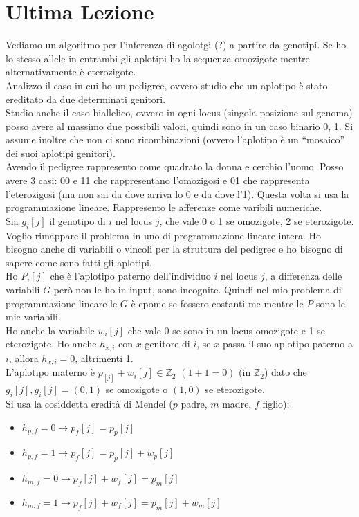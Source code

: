 \documentclass[a4paper,12pt, oneside]{book}
\begin{document}
\chapter{Ultima Lezione}
Vediamo un algoritmo per l'inferenza di agolotgi (?) a partire da
genotipi. Se ho lo stesso allele in entrambi gli aplotipi ho la
sequenza omozigote mentre alternativamente è eterozigote.\\
Analizzo il caso in cui ho un pedigree, ovvero studio che un aplotipo
è stato ereditato da due determinati genitori. \\
Studio anche il caso biallelico, ovvero in ogni locus (singola
posizione sul genoma) posso avere al massimo due possibili valori,
quindi sono in un caso binario 0, 1. Si
assume inoltre che non ci sono ricombinazioni (ovvero l'aplotipo
è un ``mosaico'' dei suoi aplotipi genitori). \\
Avendo il pedigree rappresento come quadrato la donna e cerchio
l'uomo. Posso avere 3 casi: 00 e 11 che rappresentano l'omozigosi e 01
che rappresenta l'eterozigosi (ma non sai da dove arriva lo 0 e da
dove l'1). Questa volta si usa la programmazione lineare. Rappresento
le afferenze come varibili numeriche.\\
Sia $g_i[j]$ il genotipo di $i$ nel locus $j$, che vale 0 o 1 se
omozigote, 2 se eterozigote. Voglio rimappare il problema in uno di
programmazione lineare intera. Ho bisogno anche di variabili o vincoli
per la struttura del pedigree e ho bisogno di sapere come sono fatti
gli aplotipi.\\
Ho $P_i[j]$ che è l'aplotipo paterno dell'individuo $i$ nel locus $j$,
a differenza delle variabili $G$ però non le ho in input, sono
incognite. Quindi nel mio problema di programmazione lineare le $G$ è
cpome se fossero costanti me mentre le $P$ sono le mie variabili.\\
Ho anche la variabile $w_i[j]$ che vale 0 se sono in un locus
omozigote e 1 se eterozigote. Ho anche $h_{x,i}$ con $x$ genitore di
$i$, se $x$ passa il suo aplotipo paterno a $i$, allora $h_{x,i} = 0$,
altrimenti 1.\\
L'aplotipo materno è $p_[j]+w_i[j]\in\mathbb{Z}_2$ $(1+1=0)$ (in
$\mathbb{Z}_2$) dato che $g_i[j],g_i[j]=(0,1)$ se omozigote o $(1,0)$
se eterozigote.\\
Si usa la cosiddetta eredità di Mendel ($p$ padre, $m$ madre, $f$
figlio): 
\begin{itemize}
  \item $h_{p,f}=0\to p_f[j]=p_p[j]$
  \item $h_{p,f}=1\to p_f[j]=p_p[j]+w_p[j]$
  \item $h_{m,f}=0\to p_f[j]+w_f[j]=p_m[j]$
  \item $h_{m,f}=1\to p_f[j]+w_f[j]=p_m[j]+w_m[j]$
\end{itemize}
\end{document}
